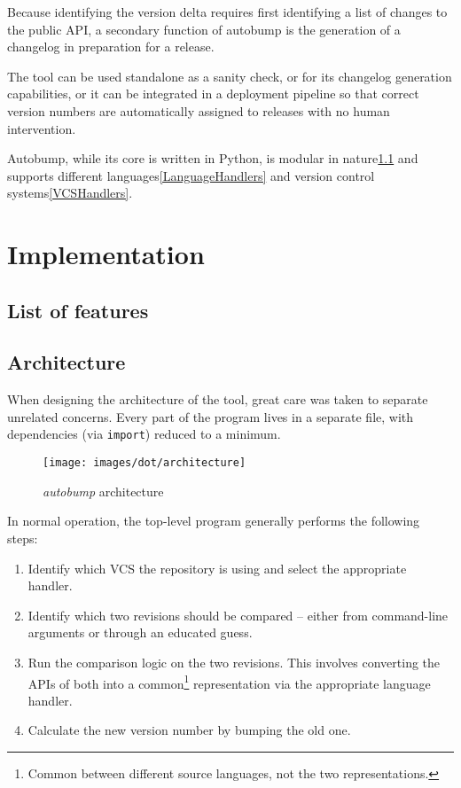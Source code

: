 \documentclass{l4proj}
\begin{document}
Because identifying the version delta requires first identifying a
list of changes to the public API, a secondary function of autobump is
the generation of a changelog in preparation for a release.

The tool can be used standalone as a sanity check, or for its
changelog generation capabilities, or it can be integrated in a
deployment pipeline so that correct version numbers are automatically
assigned to releases with no human intervention.

Autobump, while its core is written in Python, is modular in
nature\ref{Architecture} and supports different
languages\ref{LanguageHandlers} and version control
systems\ref{VCSHandlers}.

\chapter{Implementation}

\section{List of features}

\label{Architecture}
\section{Architecture}

When designing the architecture of the tool, great care was taken to
separate unrelated concerns. Every part of the program lives in a
separate file, with dependencies (via \texttt{import}) reduced to a minimum.

\begin{minipage}{0.5\textwidth}
\begin{figure}[H]
\centering
\texttt{[image: images/dot/architecture]}
\caption{\textit{autobump} architecture}
\end{figure}
\end{minipage}
\begin{minipage}{0.5\textwidth}
In normal operation, the top-level program generally performs the
following steps:

\begin{enumerate}
\item Identify which VCS the repository is using and select the
appropriate handler.
\item Identify which two revisions should be compared -- either from
command-line arguments or through an educated guess.
\item Run the comparison logic on the two revisions. This involves
converting the APIs of both into a common\footnote{Common between
different source languages, not the two representations.} representation via
the appropriate language handler.
\item Calculate the new version number by bumping the old one.
\end{enumerate}
\end{minipage}
\end{document}
